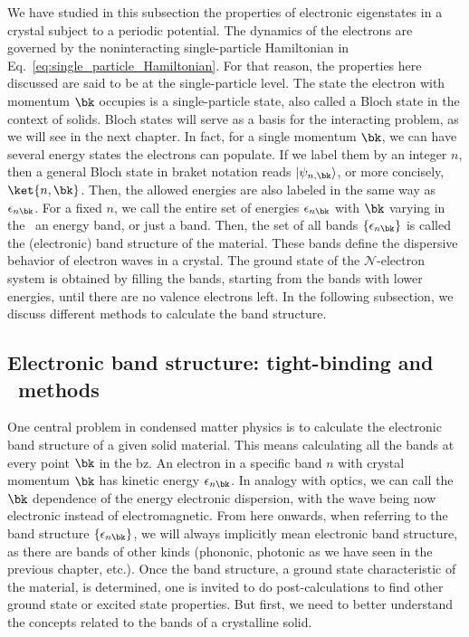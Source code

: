 We have studied in this subsection the properties of electronic eigenstates in a crystal subject to a periodic potential.
The dynamics of the electrons are governed by the noninteracting single-particle Hamiltonian in Eq.~\eqref{eq:single_particle_Hamiltonian}.
For that reason, the properties here discussed are said to be at the single-particle level.
The state the electron with momentum $\bk$ occupies is a single-particle state, also called a Bloch state in the context of solids.
Bloch states will serve as a basis for the interacting problem, as we will see in the next chapter.
In fact, for a single momentum $\bk$, we can have several energy states the electrons can populate.
If we label them by an integer $n$, then a general Bloch state in braket notation reads $|\psi_{n, \bk}\rangle$, or more concisely, $\ket{n,\bk}$.
Then, the allowed energies are also labeled in the same way as $\epsilon_{n \bk}$.
For a fixed $n$, we call the entire set of energies $\epsilon_{n \bk}$ with $\bk$ varying in the \bz~an energy band, or just a band.
Then, the set of all bands $\{\epsilon_{n \bk}\}$ is called the (electronic) band structure of the material.
These bands define the dispersive behavior of electron waves in a crystal.
The ground state of the $\mathcal{N}$-electron system is obtained by filling the bands, starting from the bands with lower energies, until there are no valence electrons left.
In the following subsection, we discuss different methods to calculate the band structure.


\subsection{Electronic band structure: tight-binding and \abinit~methods}
\label{subsec:electronic_band_structure}

One central problem in condensed matter physics is to calculate the electronic band structure of a given solid material.
This means calculating all the bands at every point $\bk$ in the \gls{bz}\@.
An electron in a specific band $n$ with crystal momentum $\bk$ has kinetic energy $\epsilon_{n \bk}$.
In analogy with optics, we can call the $\bk$ dependence of the energy electronic dispersion, with the wave being now electronic instead of electromagnetic.
From here onwards, when referring to the band structure $\{\epsilon_{n \bk}\}$, we will always implicitly mean electronic band structure, as there are bands of other kinds (phononic, photonic as we have seen in the previous chapter, etc.).
Once the band structure, a ground state characteristic of the material, is determined, one is invited to do post-calculations to find other ground state or excited state properties.
But first, we need to better understand the concepts related to the bands of a crystalline solid.

